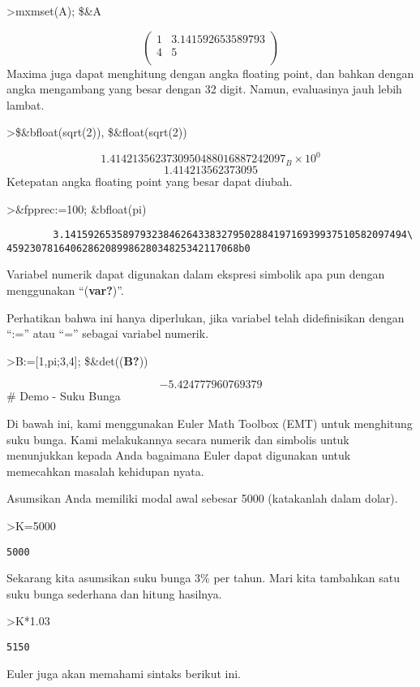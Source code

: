 \documentclass[
]{book}
\begin{document}
\textgreater mxmset(A); \$\&A

\[\begin{pmatrix}1 & 3.141592653589793 \\ 4 & 5 \\ \end{pmatrix}\]Maxima juga dapat menghitung dengan angka floating point, dan bahkan dengan angka mengambang yang besar dengan 32 digit. Namun, evaluasinya jauh lebih lambat.

\textgreater\$\&bfloat(sqrt(2)), \$\&float(sqrt(2))

\[1.4142135623730950488016887242097_B \times 10^{0}\]\[1.414213562373095\]Ketepatan angka floating point yang besar dapat diubah.

\textgreater\&fpprec:=100; \&bfloat(pi)

\begin{verbatim}
        3.14159265358979323846264338327950288419716939937510582097494\
4592307816406286208998628034825342117068b0
\end{verbatim}

Variabel numerik dapat digunakan dalam ekspresi simbolik apa pun dengan menggunakan ``(\textbf{var?})''.

Perhatikan bahwa ini hanya diperlukan, jika variabel telah didefinisikan dengan ``:='' atau ``='' sebagai variabel numerik.

\textgreater B:={[}1,pi;3,4{]}; \$\&det((\textbf{B?}))

\[-5.424777960769379\]\# Demo - Suku Bunga

Di bawah ini, kami menggunakan Euler Math Toolbox (EMT) untuk menghitung suku bunga. Kami melakukannya secara numerik dan simbolis untuk menunjukkan kepada Anda bagaimana Euler dapat digunakan untuk memecahkan masalah kehidupan nyata.

Asumsikan Anda memiliki modal awal sebesar 5000 (katakanlah dalam dolar).

\textgreater K=5000

\begin{verbatim}
5000
\end{verbatim}

Sekarang kita asumsikan suku bunga 3\% per tahun. Mari kita tambahkan satu suku bunga sederhana dan hitung hasilnya.

\textgreater K*1.03

\begin{verbatim}
5150
\end{verbatim}

Euler juga akan memahami sintaks berikut ini.
\end{document}
